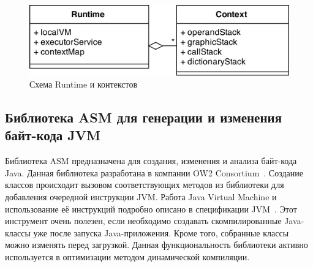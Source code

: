 \documentclass[14pt]{extarticle}
\begin{document}
	\begin{figure} [h]
			\includegraphics[width=\linewidth]{UML_Runtime_Context.png}
			\caption{Схема Runtime и контекстов}\label{UML_runtime_contexts}
	\end{figure}
		
	\subsection{Библиотека ASM для генерации и изменения байт-кода JVM}
	Библиотека ASM предназначена для создания, изменения и анализа байт-кода Java. Данная библиотека разработана в компании OW2 Consortium~\cite{ow2-site}. Создание классов происходит вызовом соответствующих методов из библиотеки для добавления очередной инструкции JVM. Работа Java Virtual Machine и использование её инструкций подробно описано в спецификации JVM~\cite{jvms}. Этот инструмент очень полезен, если необходимо создавать скомпилированные Java-классы уже после запуска Java-приложения.  Кроме того, собранные классы можно изменять перед загрузкой. Данная функциональность библиотеки активно используется в оптимизации методом динамической компиляции. 


	
	\pagebreak
\end{document}
